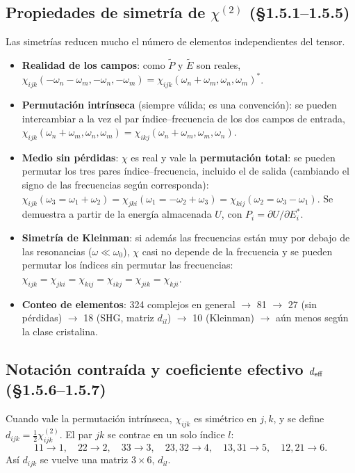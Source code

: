 \documentclass[10pt]{article}
\begin{document}
\subsection{Propiedades de simetría de $\chi^{(2)}$ (§1.5.1–1.5.5)}
Las simetrías reducen mucho el número de elementos independientes del tensor.
\begin{itemize}
\item \textbf{Realidad de los campos}: como $\tilde P$ y $\tilde E$ son reales, $\chi_{ijk}(-\omega_n-\omega_m,-\omega_n,-\omega_m)=\chi_{ijk}(\omega_n+\omega_m,\omega_n,\omega_m)^*$.
\item \textbf{Permutación intrínseca} (siempre válida; es una convención): se pueden intercambiar a la vez el par índice–frecuencia de los dos campos de entrada, $\chi_{ijk}(\omega_n+\omega_m,\omega_n,\omega_m)=\chi_{ikj}(\omega_n+\omega_m,\omega_m,\omega_n)$.
\item \textbf{Medio sin pérdidas}: $\chi$ es real y vale la \textbf{permutación total}: se pueden permutar los tres pares índice–frecuencia, incluido el de salida (cambiando el signo de las frecuencias según corresponda):
$\chi_{ijk}(\omega_3=\omega_1+\omega_2)=\chi_{jki}(\omega_1=-\omega_2+\omega_3)=\chi_{kij}(\omega_2=\omega_3-\omega_1)$. Se demuestra a partir de la energía almacenada $U$, con $P_i=\partial U/\partial E_i^*$.
\item \textbf{Simetría de Kleinman}: si además las frecuencias están muy por debajo de las resonancias ($\omega\ll\omega_0$), $\chi$ casi no depende de la frecuencia y se pueden permutar los índices sin permutar las frecuencias:
$\chi_{ijk}=\chi_{jki}=\chi_{kij}=\chi_{ikj}=\chi_{jik}=\chi_{kji}$.
\item \textbf{Conteo de elementos}: 324 complejos en general $\to$ 81 $\to$ 27 (sin pérdidas) $\to$ 18 (SHG, matriz $d_{il}$) $\to$ 10 (Kleinman) $\to$ aún menos según la clase cristalina.
\end{itemize}

\subsection{Notación contraída y coeficiente efectivo $d_{\rm eff}$ (§1.5.6–1.5.7)}
Cuando vale la permutación intrínseca, $\chi_{ijk}$ es simétrico en $j,k$, y se define $d_{ijk}=\frac12\chi^{(2)}_{ijk}$. El par $jk$ se contrae en un solo índice $l$:
\[
11\to1,\quad22\to2,\quad33\to3,\quad23,32\to4,\quad13,31\to5,\quad12,21\to6 .
\]
Así $d_{ijk}$ se vuelve una matriz $3\times6$, $d_{il}$.
\end{document}
